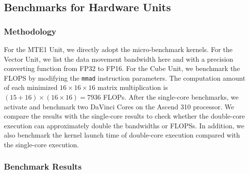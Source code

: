 \documentclass[12pt]{extbook}
\begin{document}
\subsection{Benchmarks for Hardware Units \label{sec:cube_bench}}

\subsubsection{Methodology}

For the MTE1 Unit, we directly adopt the micro-benchmark kernels. For the Vector Unit, we list the data movement bandwidth here and with a precision converting function from FP32 to FP16. For the Cube Unit, we benchmark the FLOPS by modifying the \verb|mmad| instruction parameters. The computation amount of each minimized $16 \times 16 \times 16$ matrix multiplication is $(15 + 16) \times (16 \times 16) = 7936$ FLOPs. After the single-core benchmarks, we activate and benchmark two DaVinci Cores on the Ascend 310 processor. We compare the results with the single-core results to check whether the double-core execution can approximately double the bandwidths or FLOPSs. In addition, we also benchmark the kernel launch time of double-core execution compared with the single-core execution. 

\subsubsection{Benchmark Results} 

\begin{table}[tbp]
    \caption{Ascend 310 Cube Unit benchmark results}
    \label{tab:bench}
    \begin{center}
    \end{center}
    \end{table}
\end{document}
